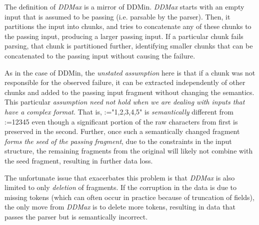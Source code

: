 \documentclass[acmsmall,screen,review,anonymous]{acmart}
\makeatletter
\newcommand{\ddmin}{\textit{ddmin}\xspace}
\def\ddmin{DDMin\xspace}
\newcommand{\ddmax}{\textit{DDMax}\xspace}
\newcommand\letterboxed[1]{%
\setlength{\fboxsep}{0pt}%
  \@tfor\@ii:=#1\do{%
    \fcolorbox{white}{light-gray}{\texttt{\strut\@ii}}%
  }%
}
\def\<#1>{\texttt{#1}}
\makeatother
\begin{document}
The definition of \ddmax is a mirror of \ddmin. \ddmax starts with an empty
input that is assumed to be passing (i.e. parsable by the parser).
Then, it partitions the input into chunks, and tries to concatenate any of
these chunks to the passing input,
producing a larger passing input.
If a particular chunk fails parsing, that chunk is partitioned further,
identifying smaller chunks that can be concatenated to the passing input without causing the failure.


As in the case of \ddmin, the \textit{unstated assumption} here is that if a chunk was
not responsible for the observed failure, it can be extracted independently of
other chunks and added to the passing input fragment without changing the
semantics. This particular \textit{assumption need not hold when we are dealing with
inputs that have a complex format}. That is, \letterboxed{"1,2,3,4,5"} is \emph{semantically}
different from \letterboxed{12345} even though a significant portion of the raw
characters from first is preserved in the second. Further, once such a
semantically changed fragment \emph{forms the seed of the passing fragment}, due to
the constraints in the input structure, the remaining fragments from the
original will likely not combine with the seed fragment, resulting in further
data loss.


The unfortunate issue that exacerbates this problem is that \ddmax is also
limited to only \emph{deletion} of fragments. If the corruption in the data
is due to missing tokens (which can often occur in practice because of truncation
of fields), the only move from \ddmax is to delete more tokens, resulting in
data that passes the parser but is semantically incorrect.
\end{document}
